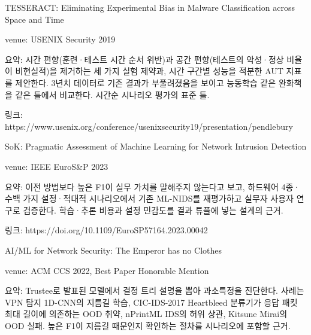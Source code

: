 \par\noindent \textbullet\enspace TESSERACT: Eliminating Experimental Bias in Malware Classification across Space and Time

\par\noindent \textbullet\enspace venue: USENIX Security 2019


\par\noindent \textbullet\enspace 요약: 시간 편향(훈련·테스트 시간 순서 위반)과 공간 편향(테스트의 악성·정상 비율이 비현실적)을 제거하는 세 가지 실험 제약과, 시간 구간별 성능을 적분한 AUT 지표를 제안한다. 3년치 데이터로 기존 결과가 부풀려졌음을 보이고 능동학습 같은 완화책을 같은 틀에서 비교한다. 시간순 시나리오 평가의 표준 틀.


\par\noindent \textbullet\enspace 링크: https:/\allowbreak{}/\allowbreak{}www.usenix.org/\allowbreak{}conference/\allowbreak{}usenixsecurity19/\allowbreak{}presentation/\allowbreak{}pendlebury



\par\noindent \textbullet\enspace SoK: Pragmatic Assessment of Machine Learning for Network Intrusion Detection

\par\noindent \textbullet\enspace venue: IEEE EuroS\&P 2023


\par\noindent \textbullet\enspace 요약: 이전 방법보다 높은 F1이 실무 가치를 말해주지 않는다고 보고, 하드웨어 4종·수백 가지 설정·적대적 시나리오에서 기존 ML-NIDS를 재평가하고 실무자 사용자 연구로 검증한다. 학습·추론 비용과 설정 민감도를 결과 튜플에 넣는 설계의 근거.


\par\noindent \textbullet\enspace 링크: https:/\allowbreak{}/\allowbreak{}doi.org/\allowbreak{}10.1109/\allowbreak{}EuroSP57164.2023.00042



\par\noindent \textbullet\enspace AI/\allowbreak{}ML for Network Security: The Emperor has no Clothes

\par\noindent \textbullet\enspace venue: ACM CCS 2022, Best Paper Honorable Mention


\par\noindent \textbullet\enspace 요약: Trustee로 발표된 모델에서 결정 트리 설명을 뽑아 과소특정을 진단한다. 사례는 VPN 탐지 1D-CNN의 지름길 학습, CIC-IDS-2017 Heartbleed 분류기가 응답 패킷 최대 길이에 의존하는 OOD 취약, nPrintML IDS의 허위 상관, Kitsune Mirai의 OOD 실패. 높은 F1이 지름길 때문인지 확인하는 절차를 시나리오에 포함할 근거.


